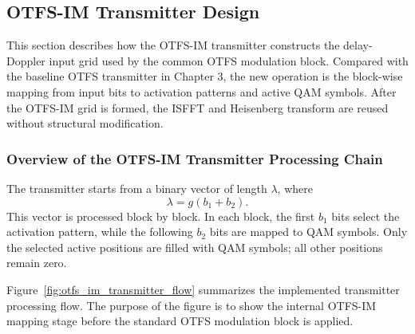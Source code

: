 \subsection{OTFS-IM Transmitter Design}

This section describes how the OTFS-IM transmitter constructs the delay-Doppler input grid used by the common OTFS modulation block. Compared with the baseline OTFS transmitter in Chapter 3, the new operation is the block-wise mapping from input bits to activation patterns and active QAM symbols. After the OTFS-IM grid is formed, the ISFFT and Heisenberg transform are reused without structural modification.

\subsubsection{Overview of the OTFS-IM Transmitter Processing Chain}

The transmitter starts from a binary vector of length \(\lambda\), where
\begin{equation}
    \lambda = g(b_1+b_2).
\end{equation}
This vector is processed block by block. In each block, the first \(b_1\) bits select the activation pattern, while the following \(b_2\) bits are mapped to QAM symbols. Only the selected active positions are filled with QAM symbols; all other positions remain zero.

Figure~\ref{fig:otfs_im_transmitter_flow} summarizes the implemented transmitter processing flow. The purpose of the figure is to show the internal OTFS-IM mapping stage before the standard OTFS modulation block is applied.


